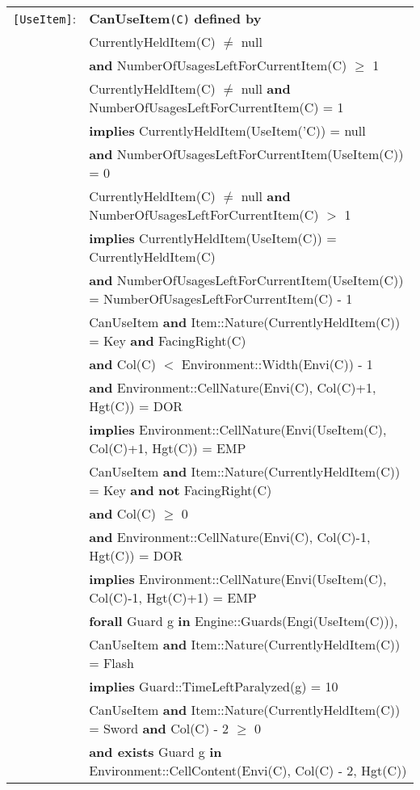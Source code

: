 \documentclass[7pt]{article}
\begin{document}
\begin{tabular}{rl}
\texttt{[UseItem]}:  & \textbf{CanUseItem}\texttt{(C)} \textbf{defined by} \\ 
&\quad\quad CurrentlyHeldItem(C) $\neq$ null \\
&\quad\quad \textbf{and} NumberOfUsagesLeftForCurrentItem(C) $\geq$ 1  \\
&  CurrentlyHeldItem(C) $\neq$ null \textbf{and} NumberOfUsagesLeftForCurrentItem(C) = 1 \\
& \quad \textbf{implies}  CurrentlyHeldItem(UseItem('C)) = null \\
& \quad\quad \textbf{and} NumberOfUsagesLeftForCurrentItem(UseItem(C)) = 0 \\
&  CurrentlyHeldItem(C) $\neq$ null \textbf{and} NumberOfUsagesLeftForCurrentItem(C) $>$ 1 \\
& \quad \textbf{implies}  CurrentlyHeldItem(UseItem(C)) = CurrentlyHeldItem(C) \\
& \quad\quad \textbf{and} NumberOfUsagesLeftForCurrentItem(UseItem(C)) = NumberOfUsagesLeftForCurrentItem(C) - 1 \\
& CanUseItem \textbf{and} Item::Nature(CurrentlyHeldItem(C)) = Key \textbf{and} FacingRight(C) \\
& \quad \textbf{and} Col(C) $<$ Environment::Width(Envi(C)) - 1 \\
& \quad \textbf{and} Environment::CellNature(Envi(C), Col(C)+1, Hgt(C)) = DOR \\
& \quad \textbf{implies} Environment::CellNature(Envi(UseItem(C), Col(C)+1, Hgt(C)) = EMP \\
& CanUseItem \textbf{and} Item::Nature(CurrentlyHeldItem(C)) = Key \textbf{and} \textbf{not} FacingRight(C) \\
& \quad \textbf{and} Col(C) $\geq$ 0 \\
& \quad \textbf{and} Environment::CellNature(Envi(C), Col(C)-1, Hgt(C)) = DOR \\
& \quad \textbf{implies} Environment::CellNature(Envi(UseItem(C), Col(C)-1, Hgt(C)+1) = EMP \\
& \textbf{forall} Guard g \textbf{in} Engine::Guards(Engi(UseItem(C))), \\
&  \quad CanUseItem \textbf{and} Item::Nature(CurrentlyHeldItem(C)) = Flash \\
& \quad\quad \textbf{implies} Guard::TimeLeftParalyzed(g) = 10 \\
& CanUseItem \textbf{and} Item::Nature(CurrentlyHeldItem(C)) = Sword \textbf{and} Col(C) - 2 $\geq$  0 \\
& \quad \textbf{and exists} Guard g \textbf{in} Environment::CellContent(Envi(C), Col(C) - 2, Hgt(C)) \\

\end{tabular}
\end{document}
